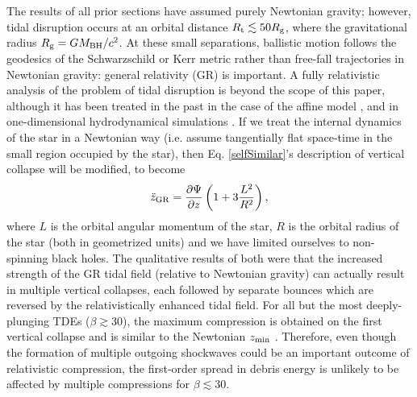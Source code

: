 \documentclass[useAMS, twocolumn, usenatbib]{mn2e}
\begin{document}
The results of all prior sections have assumed purely Newtonian gravity; however, tidal disruption occurs at an orbital distance $R_{\rm t}\lesssim 50R_{\rm g}$, where the gravitational radius $R_{\rm g}=GM_{\rm BH}/c^2$.  At these small separations, ballistic motion follows the geodesics of the Schwarzschild or Kerr metric rather than free-fall trajectories in Newtonian gravity: general relativity (GR) is important.  A fully relativistic analysis of the problem of tidal disruption is beyond the scope of this paper, although it has been treated in the past in the case of the affine model \citep{LuminetMarck85}, and in one-dimensional hydrodynamical simulations \citep{BrassartLuminet10}.  If we treat the internal dynamics of the star in a Newtonian way (i.e. assume tangentially flat space-time in the small region occupied by the star), then Eq. \ref{selfSimilar}'s description of vertical collapse will be modified, to become
\begin{equation}
\ddot{z}_{\rm GR}=\frac{\partial\Psi}{\partial z}\left(1+3\frac{L^2}{R^2}\right),
\end{equation}
where $L$ is the orbital angular momentum of the star, $R$ is the orbital radius of the star (both in geometrized units) and we have limited ourselves to non-spinning black holes.  The qualitative results of both \citet{LuminetMarck85, BrassartLuminet10} were that the increased strength of the GR tidal field (relative to Newtonian gravity) can actually result in multiple vertical collapses, each followed by separate bounces which are reversed by the relativistically enhanced tidal field.  For all but the most deeply-plunging TDEs ($\beta \gtrsim 30$), the maximum compression is obtained on the first vertical collapse and is similar to the Newtonian $z_{\rm min}$ \citep[Fig. 10]{LuminetMarck85}.  Therefore, even though the formation of multiple outgoing shockwaves could be an important outcome of relativistic compression, the first-order spread in debris energy is unlikely to be affected by multiple compressions for $\beta \lesssim 30$.
\end{document}
